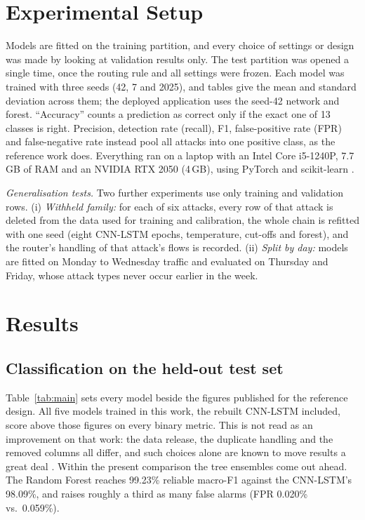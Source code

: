 \documentclass[conference]{IEEEtran}
\begin{document}
\section{Experimental Setup}
Models are fitted on the training partition, and every choice of settings or design was made by
looking at validation results only. The test partition was opened a single time, once the routing
rule and all settings were frozen. Each model was trained with three seeds (42, 7 and 2025), and
tables give the mean and standard deviation across them; the deployed application uses the seed-42
network and forest. ``Accuracy'' counts a prediction as correct only if the exact one of 13
classes is right. Precision, detection rate (recall), F1, false-positive rate (FPR) and
false-negative rate instead pool all attacks into one positive class, as the reference work does.
Everything ran on a laptop with an Intel Core i5-1240P, 7.7\,GB of RAM and an NVIDIA RTX 2050
(4\,GB), using PyTorch \cite{paszke2019pytorch} and scikit-learn \cite{pedregosa2011scikit}.

\textit{Generalisation tests.} Two further experiments use only training and validation rows.
(i) \emph{Withheld family:} for each of six attacks, every row of that attack is deleted from the
data used for training and calibration, the whole chain is refitted with one seed (eight CNN-LSTM epochs,
temperature, cut-offs and forest), and the router's handling of that attack's flows is recorded.
(ii) \emph{Split by day:} models are fitted on Monday to Wednesday traffic and evaluated on Thursday and
Friday, whose attack types never occur earlier in the week.

\section{Results}

\subsection{Classification on the held-out test set}
Table~\ref{tab:main} sets every model beside the figures published for the reference design. All
five models trained in this work, the rebuilt CNN-LSTM included, score above those figures on every binary
metric. This is not read as an improvement on that work: the data release, the duplicate
handling and the removed columns all differ, and such choices alone are known to move results a
great deal \cite{engelen2021troubleshooting,arp2022dos}. Within the present comparison the tree
ensembles come out ahead. The Random Forest reaches 99.23\% reliable macro-F1 against the
CNN-LSTM's 98.09\%, and raises roughly a third as many false alarms (FPR 0.020\% vs.\ 0.059\%).
\end{document}
